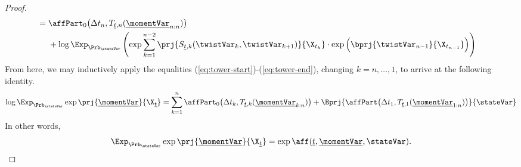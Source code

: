 \begin{proof}
\begin{align}
    \label{eq:tower-end}
    &= \begin{aligned}[t]
      &\affPart_0\big(\Delta t_n, T_{\underline t,n}(\underline\momentVar_{n:n})\big) \\
      &+ \log\Exp_{\Prb_\stateVar}\left( \exp\sum_{k=1}^{n-2} \prj{S_{\underline t, k}(\twistVar_k, \twistVar_{k+1})}{\X_{t_k}} \cdot \exp\Big( \bprj{\twistVar_{n-1}}{\X_{t_{n-1}}} \Big)   \right) 
    \end{aligned}
  \end{align}
  From here, we may inductively apply the equalities (\ref{eq:tower-start})-(\ref{eq:tower-end}), changing $k = n, \ldots, 1$, to arrive at the following identity.
  \begin{equation}
    \log\Exp_{\Prb_\stateVar} \exp\prj{\underline\momentVar}{\X_{\underline t}} = \sum_{k=1}^n \affPart_0\big(\Delta t_k, T_{\underline t,k}(\underline\momentVar_{k:n})\big) + \Bprj{\affPart\big(\Delta t_1, T_{\underline t,1}(\underline\momentVar_{1:n}) \big)}{\stateVar}
  \end{equation}
  In other words, 
  \begin{equation}
    \Exp_{\Prb_\stateVar} \exp\prj{\underline\momentVar}{\X_{\underline t}} = \exp\aff(\underline t, \underline\momentVar, \stateVar).
  \end{equation}


\end{proof}
